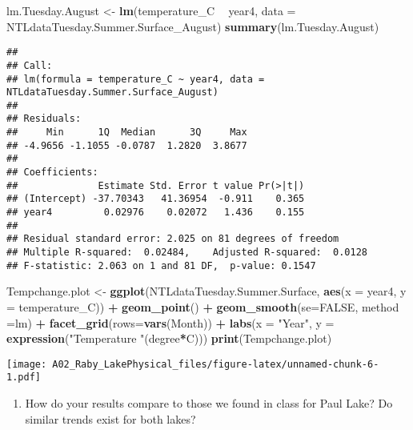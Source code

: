 \documentclass[]{article}
\newenvironment{Shaded}{\begin{snugshade}}{\end{snugshade}}
\newcommand{\DataTypeTok}[1]{\textcolor[rgb]{0.13,0.29,0.53}{#1}}
\newcommand{\KeywordTok}[1]{\textcolor[rgb]{0.13,0.29,0.53}{\textbf{#1}}}
\newcommand{\NormalTok}[1]{#1}
\newcommand{\OperatorTok}[1]{\textcolor[rgb]{0.81,0.36,0.00}{\textbf{#1}}}
\newcommand{\OtherTok}[1]{\textcolor[rgb]{0.56,0.35,0.01}{#1}}
\newcommand{\StringTok}[1]{\textcolor[rgb]{0.31,0.60,0.02}{#1}}
\providecommand{\tightlist}{%
  \setlength{\itemsep}{0pt}\setlength{\parskip}{0pt}}
\begin{document}
\begin{Shaded}
\begin{Highlighting}[]
\NormalTok{lm.Tuesday.August <-}\StringTok{ }\KeywordTok{lm}\NormalTok{(temperature_C }\OperatorTok{~}\StringTok{ }\NormalTok{year4, }\DataTypeTok{data =}\NormalTok{ NTLdataTuesday.Summer.Surface_August)}
\KeywordTok{summary}\NormalTok{(lm.Tuesday.August)}
\end{Highlighting}
\end{Shaded}

\begin{verbatim}
## 
## Call:
## lm(formula = temperature_C ~ year4, data = NTLdataTuesday.Summer.Surface_August)
## 
## Residuals:
##     Min      1Q  Median      3Q     Max 
## -4.9656 -1.1055 -0.0787  1.2820  3.8677 
## 
## Coefficients:
##              Estimate Std. Error t value Pr(>|t|)
## (Intercept) -37.70343   41.36954  -0.911    0.365
## year4         0.02976    0.02072   1.436    0.155
## 
## Residual standard error: 2.025 on 81 degrees of freedom
## Multiple R-squared:  0.02484,    Adjusted R-squared:  0.0128 
## F-statistic: 2.063 on 1 and 81 DF,  p-value: 0.1547
\end{verbatim}

\begin{Shaded}
\begin{Highlighting}[]
\NormalTok{Tempchange.plot <-}
\StringTok{  }\KeywordTok{ggplot}\NormalTok{(NTLdataTuesday.Summer.Surface, }\KeywordTok{aes}\NormalTok{(}\DataTypeTok{x =}\NormalTok{ year4, }\DataTypeTok{y =}\NormalTok{ temperature_C)) }\OperatorTok{+}
\StringTok{  }\KeywordTok{geom_point}\NormalTok{() }\OperatorTok{+}
\StringTok{  }\KeywordTok{geom_smooth}\NormalTok{(}\DataTypeTok{se=}\OtherTok{FALSE}\NormalTok{, }\DataTypeTok{method =}\NormalTok{lm) }\OperatorTok{+}
\StringTok{  }\KeywordTok{facet_grid}\NormalTok{(}\DataTypeTok{rows=}\KeywordTok{vars}\NormalTok{(Month)) }\OperatorTok{+}
\StringTok{  }\KeywordTok{labs}\NormalTok{(}\DataTypeTok{x =} \StringTok{"Year"}\NormalTok{, }\DataTypeTok{y =} \KeywordTok{expression}\NormalTok{(}\StringTok{"Temperature "}\NormalTok{(degree}\OperatorTok{*}\NormalTok{C)))}
  \KeywordTok{print}\NormalTok{(Tempchange.plot)}
\end{Highlighting}
\end{Shaded}

\texttt{[image: A02\_Raby\_LakePhysical\_files/figure-latex/unnamed-chunk-6-1.pdf]}

\begin{enumerate}
\def\labelenumi{\arabic{enumi}.}
\setcounter{enumi}{11}
\tightlist
\item
  How do your results compare to those we found in class for Paul Lake?
  Do similar trends exist for both lakes?
\end{enumerate}
\end{document}
